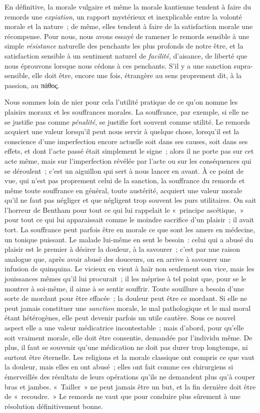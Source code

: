 \documentclass[french,twoside]{book} %
\begin{document}
En définitive, la morale vulgaire et même la morale kantienne tendent à faire du remords une \emph{expiation}, un rapport mystérieux et inexplicable entre la volonté morale et la nature ; de même, elles tendent à faire de la satisfaction morale une récompense. Pour nous, nous avons essayé de ramener le remords sensible à une simple \emph{résistance} naturelle des penchants les plus profonds de notre être, et la satisfaction sensible à un sentiment naturel de \emph{facilité}, d’aisance, de liberté que nous éprouvons lorsque nous cédons à ces penchants. S’il y a une sanction supra-sensible, elle doit être, encore une fois, étrangère au sens proprement dit, à la passion, au πάθος.\par
Nous sommes loin de nier pour cela l’utilité pratique de ce qu’on nomme les plaisirs moraux et les souffrances morales. La souffrance, par exemple, si elle ne se justifie pas comme \emph{pénalité}, se justifie fort souvent comme utilité. Le remords acquiert une valeur lorsqu’il peut nous servir à quelque chose, lorsqu’il est la conscience d’une imperfection encore actuelle soit dans ses causes, soit dans ses effets, et dont l’acte passé était simplement le signe ; alors il ne porte pas sur cet acte même, mais sur l’imperfection révélée par l’acte ou sur les conséquences qui se déroulent ; c’est un aiguillon qui sert à nous lancer en avant. À ce point de vue, qui n’est pas proprement celui de la sanction, la souffrance du remords et même toute souffrance en général, toute austérité, acquiert une valeur morale qu’il ne faut pas négliger et que négligent trop souvent les purs utilitaires. On sait l’horreur de Bentham pour tout ce qui lui rappelait le « principe ascétique, » pour tout ce qui lui apparaissait comme le moindre sacrifice d’un plaisir ; il avait tort. La souffrance peut parfois être en morale ce que sont les amers en médecine, un tonique puissant. Le malade lui-même en sent le besoin : celui qui a abusé du plaisir est le premier à désirer la douleur, à la savourer ; c’est par une raison analogue que, après avoir abusé des douceurs, on en arrive à savourer une infusion de quinquina. Le vicieux en vient à haïr non seulement son vice, mais les jouissances mêmes qu’il lui procurait ; il les méprise à tel point que, pour se le montrer à soi-même, il aime à se sentir souffrir. Toute souillure a besoin d’une sorte de mordant pour être effacée ; la douleur peut être ce mordant. Si elle ne peut jamais constituer une \emph{sanction} morale, le mal pathologique et le mal moral étant hétérogènes, elle peut devenir parfois un utile cautère. Sous ce nouvel aspect elle a une valeur médicatrice incontestable ; mais d’abord, pour qu’elle soit vraiment morale, elle doit être consentie, demandée par l’individu même. De plus, il faut se souvenir qu’une médication ne doit pas durer trop longtemps, ni surtout être éternelle. Les religions et la morale classique ont compris ce que vaut la douleur, mais elles en ont abusé ; elles ont fait comme ces chirurgiens si émerveillés des résultats de leurs opérations qu’ils ne demandent plus qu’à couper bras et jambes. « Tailler » ne peut jamais être un but, et la fin dernière doit être de « recoudre. » Le remords ne vaut que pour conduire plus sûrement à une résolution définitivement bonne.\par
\end{document}
